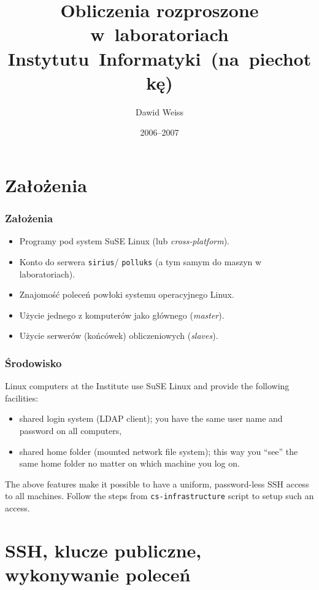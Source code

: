 \documentclass[compress]{beamer}
\title{Obliczenia rozproszone w~laboratoriach Instytutu~Informatyki~(na~piechotkę)}
\author{Dawid Weiss}
\date{2006--2007}
\begin{document}
\begin{frame}[plain]
    \titlepage
\end{frame}

\section{Założenia}

\begin{frame}
    \frametitle{Założenia}

    \begin{itemize}
        \item Programy pod system SuSE Linux (lub \emph{cross-platform}).
        \item Konto do serwera \texttt{sirius}/ \texttt{polluks} (a tym samym do
        maszyn w laboratoriach).
        \item Znajomość poleceń powłoki systemu operacyjnego Linux.
    \end{itemize}

    \medskip    
    \begin{itemize}
        \item Użycie jednego z komputerów jako głównego (\emph{master}).
        \item Użycie serwerów (końcówek) obliczeniowych (\emph{slaves}).
    \end{itemize}
\end{frame}

\begin{frame}
    \frametitle{Środowisko}

    Linux computers at the Institute use SuSE Linux and provide the following facilities:
    \begin{itemize}
        \item shared login system (LDAP client); you have the same user name and password on all
        computers,
        \item shared home folder (mounted network file system); this way you ``see'' the same home folder
        no matter on which machine you log on.
    \end{itemize}

    The above features make it possible to have a uniform, password-less SSH access to all machines. Follow 
    the steps from \texttt{cs-infrastructure} script to setup such an access.
\end{frame}


\section[SSH]{SSH, klucze publiczne, wykonywanie poleceń}
\end{document}
